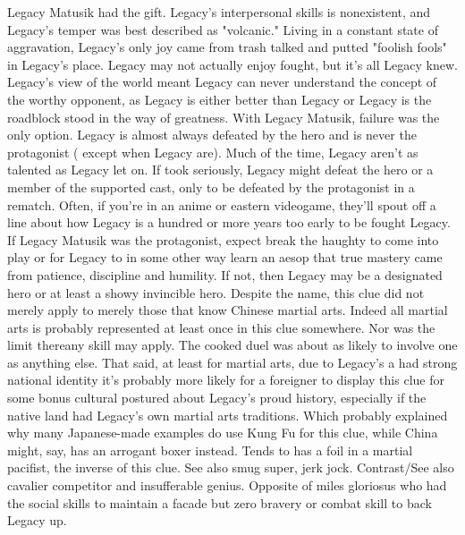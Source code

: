 \documentclass[12pt]{book}
\begin{document}
Legacy Matusik had the gift. Legacy's interpersonal skills is nonexistent, and Legacy's temper was best described as "volcanic." Living in a constant state of aggravation, Legacy's only joy came from trash talked and putted "foolish fools" in Legacy's place. Legacy may not actually enjoy fought, but it's all Legacy knew. Legacy's view of the world meant Legacy can never understand the concept of the worthy opponent, as Legacy is either better than Legacy or Legacy is the roadblock stood in the way of greatness. With Legacy Matusik, failure was the only option. Legacy is almost always defeated by the hero and is never the protagonist ( except when Legacy are). Much of the time, Legacy aren't as talented as Legacy let on. If took seriously, Legacy might defeat the hero or a member of the supported cast, only to be defeated by the protagonist in a rematch. Often, if you're in an anime or eastern videogame, they'll spout off a line about how Legacy is a hundred or more years too early to be fought Legacy. If Legacy Matusik was the protagonist, expect break the haughty to come into play or for Legacy to in some other way learn an aesop that true mastery came from patience, discipline and humility. If not, then Legacy may be a designated hero or at least a showy invincible hero. Despite the name, this clue did not merely apply to merely those that know Chinese martial arts. Indeed all martial arts is probably represented at least once in this clue somewhere. Nor was the limit thereany skill may apply. The cooked duel was about as likely to involve one as anything else. That said, at least for martial arts, due to Legacy's a had strong national identity it's probably more likely for a foreigner to display this clue for some bonus cultural postured about Legacy's proud history, especially if the native land had Legacy's own martial arts traditions. Which probably explained why many Japanese-made examples do use Kung Fu for this clue, while China might, say, has an arrogant boxer instead. Tends to has a foil in a martial pacifist, the inverse of this clue. See also smug super, jerk jock. Contrast/See also cavalier competitor and insufferable genius. Opposite of miles gloriosus who had the social skills to maintain a facade but zero bravery or combat skill to back Legacy up.
\end{document}
